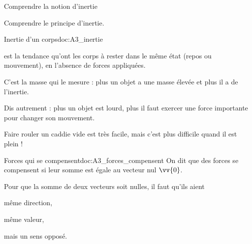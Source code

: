 \teteSndMouv


\vspace*{-32pt}


\begin{objectifs}
  \item Comprendre la notion d'inertie
  \item Comprendre le principe d'inertie.
\end{objectifs}


\begin{doc}{Inertie d'un corps}{doc:A3_inertie}
  \begin{encart}
     est la tendance qu'ont les corps à rester dans le même état (repos ou mouvement), en l'absence de forces appliquées.
  \end{encart}
    
  \fleche C'est la masse qui le mesure : plus un objet a une masse élevée et plus il a de l'inertie.
  
  \fleche Dis autrement : plus un objet est lourd, plus il faut exercer une force importante pour changer son mouvement.
  
  \exemple Faire rouler un caddie vide est très facile, mais c'est plus difficile quand il est plein !
\end{doc}


\begin{doc}{Forces qui se compensent}{doc:A3_forces_compensent}
  On dit que des forces se compensent si leur somme est égale au vecteur nul $\vv{0}$.

  Pour que la somme de deux vecteurs soit nulles, il faut qu'ils aient 
  \begin{listePoints}
    \item même direction,
    \item même valeur,
    \item mais un sens opposé.
  \end{listePoints}

  \centering
\end{doc}





